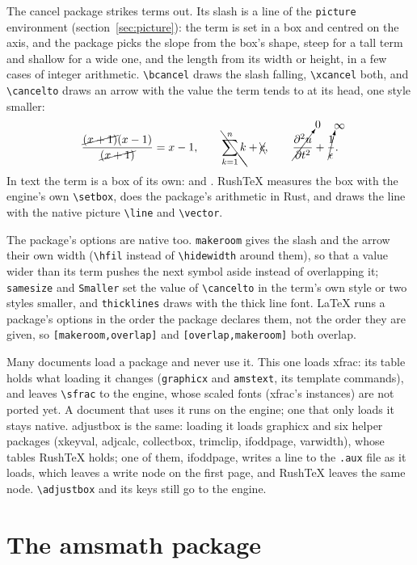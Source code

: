 \documentclass{article}
\numberwithin{equation}{section}
\theoremstyle{definition}
\theoremstyle{remark}
\begin{document}
The cancel package strikes terms out. Its slash is a line of the \verb|picture|
environment (section~\ref{sec:picture}): the term is set in a box and centred on the
axis, and the package picks the slope from the box's shape, steep for a tall term and
shallow for a wide one, and the length from its width or height, in a few cases of
integer arithmetic. \verb|\bcancel| draws the slash falling, \verb|\xcancel| both, and
\verb|\cancelto| draws an arrow with the value the term tends to at its head, one style
smaller:
\[ \frac{\cancel{(x+1)}(x-1)}{\cancel{(x+1)}} = x-1, \qquad
   \bcancel{\sum_{k=1}^{n} k} + \xcancel{c}, \qquad
   \cancelto{0}{\frac{\partial^2 u}{\partial t^2}} + \cancelto{\infty}{\frac{1}{\epsilon}} . \]
In text the term is a box of its own:  and . RushTeX
measures the box with the engine's own \verb|\setbox|, does the package's arithmetic in
Rust, and draws the line with the native picture \verb|\line| and \verb|\vector|.

The package's options are native too. \texttt{makeroom} gives the slash and the arrow
their own width (\verb|\hfil| instead of \verb|\hidewidth| around them), so that a value
wider than its term pushes the next symbol aside instead of overlapping it;
\texttt{samesize} and \texttt{Smaller} set the value of \verb|\cancelto| in the term's
own style or two styles smaller, and \texttt{thicklines} draws with the thick line font.
LaTeX runs a package's options in the order the package declares them, not the order they
are given, so \verb|[makeroom,overlap]| and \verb|[overlap,makeroom]| both overlap.

Many documents load a package and never use it. This one loads xfrac: its table holds what
loading it changes (\texttt{graphicx} and \texttt{amstext}, its template commands), and
leaves \verb|\sfrac| to the engine, whose scaled fonts (xfrac's instances) are not ported
yet. A document that uses it runs on the engine; one that only loads it stays native.
adjustbox is the same: loading it loads graphicx and six helper packages (xkeyval,
adjcalc, collectbox, trimclip, ifoddpage, varwidth), whose tables RushTeX holds; one of
them, ifoddpage, writes a line to the \texttt{.aux} file as it loads, which leaves a write
node on the first page, and RushTeX leaves the same node. \verb|\adjustbox| and its keys
still go to the engine.

\section{The amsmath package}\label{sec:amsmath}
\end{document}
